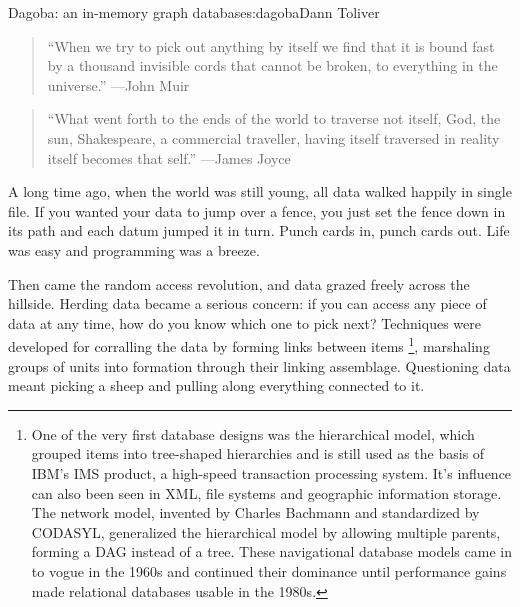 \begin{aosachapter}{Dagoba: an in-memory graph database}{s:dagoba}{Dann Toliver}

\label{prologue}

\begin{quote}
``When we try to pick out anything by itself we find that it is bound
fast by a thousand invisible cords that cannot be broken, to everything
in the universe.'' ---John Muir
\end{quote}

\begin{quote}
``What went forth to the ends of the world to traverse not itself, God,
the sun, Shakespeare, a commercial traveller, having itself traversed in
reality itself becomes that self.'' ---James Joyce
\end{quote}

A long time ago, when the world was still young, all data walked happily
in single file. If you wanted your data to jump over a fence, you just
set the fence down in its path and each datum jumped it in turn. Punch
cards in, punch cards out. Life was easy and programming was a breeze.

Then came the random access revolution, and data grazed freely across
the hillside. Herding data became a serious concern: if you can access
any piece of data at any time, how do you know which one to pick next?
Techniques were developed for corralling the data by forming links
between items \footnote{One of the very first database designs was the
  hierarchical model, which grouped items into tree-shaped hierarchies
  and is still used as the basis of IBM's IMS product, a high-speed
  transaction processing system. It's influence can also been seen in
  XML, file systems and geographic information storage. The network
  model, invented by Charles Bachmann and standardized by CODASYL,
  generalized the hierarchical model by allowing multiple parents,
  forming a DAG instead of a tree. These navigational database models
  came in to vogue in the 1960s and continued their dominance until
  performance gains made relational databases usable in the 1980s.},
marshaling groups of units into formation through their linking
assemblage. Questioning data meant picking a sheep and pulling along
everything connected to it.


\end{aosachapter}
